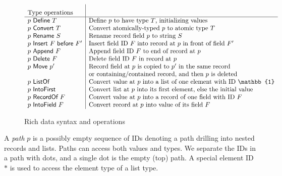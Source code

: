 \documentclass[english,submission]{programming}
\theoremstyle{definition}
\newcommand{\mathbox}[1]{\colorbox{black!10}{$#1$\phantom{i\hspace{-3.5pt}}}}
\begin{document}
\begin{figure}[h]
{\begin{minipage}{\textwidth}
\[\begin{array}{l|l}
  \textrm{Type operations} & \rule[0pt]{0pt}{16pt}\\
  \hline
  p \textsf{ Define } T & \textrm{Define $p$ to have type $T$, initializing values}\\
  p \textsf{ Convert } T & \textrm{Convert atomically-typed $p$ to atomic type $T$}\\

  p \textsf{ Rename } S & \textrm{Rename record field $p$ to string $S$}\\

  p \textsf{ Insert } F \textsf{ before } F' & \textrm{Insert field ID $F$ into record at $p$ in front of field $F'$}\\
  p \textsf{ Append } F & \textrm{Append field ID $F$ to end of record at $p$}\\

  p \textsf{ Delete } F & \textrm{Delete field ID $F$ in record at $p$}\\

  p \textsf{ Move } p' & \textrm{Record field at $p$ is copied to $p'$ in the same record}\\
  & \textrm{or containing\slash contained record, and then $p$ is deleted}\\


  p \textsf{ ListOf } & \textrm{Convert value at $p$ into a list of one element with ID $\mathbb{1}$}\\
  p \textsf{ IntoFirst } & \textrm{Convert list at $p$ into its first element, else the initial value} \\

  p \textsf{ RecordOf } F & \textrm{Convert value at $p$ into a record of one field with ID $F$} \\
  p \textsf{ IntoField } F & \textrm{Convert record at $p$ into value of its field $F$} \\

\end{array}\]
\end{minipage}
}
\caption{Rich data syntax and operations}
\label{fig:rich-data}
\end{figure}


A \textit{path} \mathbox{p} is a possibly empty sequence of IDs denoting a path drilling into nested records and lists. Paths can access both values and types. We separate the IDs in a path with dots, and a single dot is the empty (top) path. A special element ID~\mathbox{*} is used to access the element type of a list type.
\end{document}
